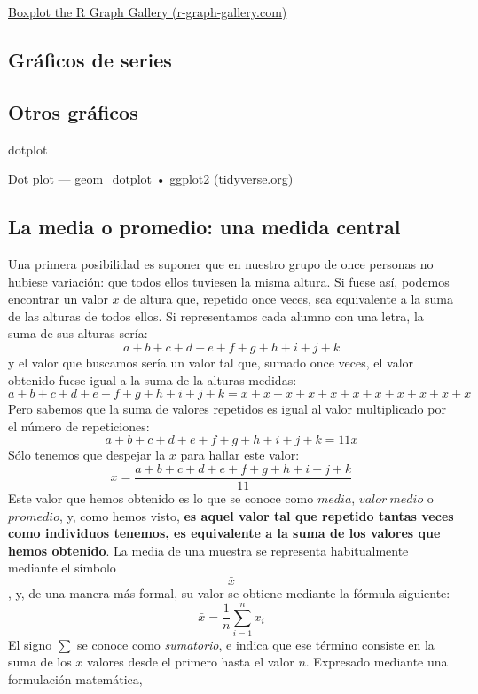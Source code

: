 \documentclass[
  letterpaper,
  DIV=11,
  numbers=noendperiod,
  oneside]{scrreprt}
\begin{document}
\href{http://r-graph-gallery.com/boxplot.html}{Boxplot \textbar{} the R
Graph Gallery (r-graph-gallery.com)}

\hypertarget{gruxe1ficos-de-series}{%
\subsection{Gráficos de series}\label{gruxe1ficos-de-series}}

\hypertarget{otros-gruxe1ficos}{%
\subsection{Otros gráficos}\label{otros-gruxe1ficos}}

dotplot

\href{https://ggplot2.tidyverse.org/reference/geom_dotplot.html}{Dot
plot --- geom\_dotplot • ggplot2 (tidyverse.org)}

\hypertarget{la-media-o-promedio-una-medida-central}{%
\subsection{La media o promedio: una medida
central}\label{la-media-o-promedio-una-medida-central}}

Una primera posibilidad es suponer que en nuestro grupo de once personas
no hubiese variación: que todos ellos tuviesen la misma altura. Si fuese
así, podemos encontrar un valor \(x\) de altura que, repetido once
veces, sea equivalente a la suma de las alturas de todos ellos. Si
representamos cada alumno con una letra, la suma de sus alturas sería:
\[
a+ b + c + d + e + f + g + h + i + j + k
\] y el valor que buscamos sería un valor tal que, sumado once veces, el
valor obtenido fuese igual a la suma de la alturas medidas: \[
a+b+c+d+e+f+g+h+i+j+k = x+x+x+x+x+x+x+x+x+x+x
\] Pero sabemos que la suma de valores repetidos es igual al valor
multiplicado por el número de repeticiones: \[
a+b+c+d+e+f+g+h+i+j+k = 11 x
\] Sólo tenemos que despejar la \(x\) para hallar este valor: \[
x = \frac{a+b+c+d+e+f+g+h+i+j+k}{11}
\] Este valor que hemos obtenido es lo que se conoce como \(media\),
\(valor{\ }medio\) o \(promedio\), y, como hemos visto, \textbf{es aquel
valor tal que repetido tantas veces como individuos tenemos, es
equivalente a la suma de los valores que hemos obtenido}. La media de
una muestra se representa habitualmente mediante el símbolo \[\bar{x}\],
y, de una manera más formal, su valor se obtiene mediante la fórmula
siguiente: \[
{\bar{x}={\frac {1}{n}}\sum _{i=1}^{n}x_{i}}
\] El signo \(\sum\) se conoce como \emph{sumatorio}, e indica que ese
término consiste en la suma de los \(x\) valores desde el primero hasta
el valor \(n\). Expresado mediante una formulación matemática,
\end{document}
